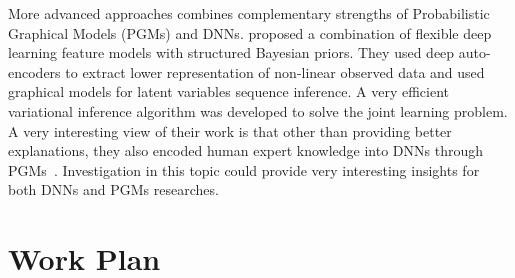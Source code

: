 \documentclass{article} \usepackage{tabularx}
\renewcommand{\citename}{\citet} \renewcommand{\cite}{\citep}
\begin{document}
More advanced approaches combines complementary strengths of
Probabilistic Graphical Models (PGMs) and DNNs.
\citename{johnson2016composing} proposed a combination of
flexible deep learning feature models with structured Bayesian
priors. They used deep auto-encoders to extract lower
representation of non-linear observed data and used graphical
models for latent variables sequence inference. A very efficient
variational inference algorithm was developed to solve the joint
learning problem. A very interesting view of their work is that
other than providing better explanations, they also encoded human
expert knowledge into DNNs through
PGMs~\cite{johnson2016composing}. Investigation in this topic
could provide very interesting insights for both DNNs and PGMs
researches.

\section{Work Plan}
\end{document}
